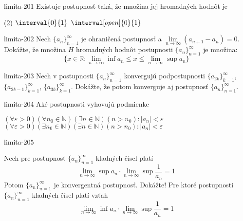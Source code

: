 \begin{defproblem}{limita-201}
Existuje postupnosť taká, že množina jej hromadných hodnôt je
\begin{tasks}(2)
\task $\interval{0}{1}$
\task $\interval[open]{0}{1}$
\end{tasks}
\end{defproblem}

\begin{defproblem}{limita-202}
Nech ${\{a_n\}}_{n=1}^\infty$ je ohraničená postupnosť a $\lim\limits_{n
\rightarrow \infty} (a_{n+1}-a_n)=0$. Dokážte, že množina $H$ hromadných hodnôt
postupnosti ${\{a_n\}}_{n=1}^\infty$ je množina:
\[
    \{x \in \mathbb{R}:
    \lim\limits_{n \rightarrow \infty} \inf a_n \leq x \leq \lim\limits_{n
    \rightarrow \infty} \sup a_n\}
\]
\end{defproblem}

\begin{defproblem}{limita-203}
Nech v postupnosti ${\{a_n\}}_{n=1}^\infty$ konvergujú podpostupnosti
${\{a_{2k}\}}_{k=1}^\infty$, ${\{a_{2k-1}\}}_{k=1}^\infty$,
${\{a_{3k}\}}_{k=1}^\infty$. Dokážte, že potom konverguje aj postupnosť
${\{a_n\}}_{n=1}^\infty$.
\end{defproblem}

\begin{defproblem}{limita-204}
Aké postupnosti vyhovujú podmienke
\begin{tasks}
\task
    $
        (\forall \varepsilon >0)
            (\forall n_0 \in \mathbb{N})
                (\exists n \in \mathbb{N})
                    (n > n_0): |a_n|< \varepsilon
    $
\task
    $
        (\forall \varepsilon > 0)
            (\exists n_0 \in \mathbb{N})
                (\exists n \in \mathbb{N})
                    (n > n_0): |a_n|< \varepsilon
    $
\end{tasks}
\end{defproblem}

\begin{defproblem}{limita-205}
\begin{tasks}
\task
    Nech pre postupnosť ${\{a_n\}}_{n=1}^\infty$ kladných čísel platí
    \[
        \lim\limits_{n \rightarrow \infty} \sup a_n
        \cdot
        \lim\limits_{n \rightarrow \infty} \sup \frac{1}{a_n} = 1
    \]
    Potom ${\{a_n\}}_{n=1}^\infty$ je konvergentná postupnosť. Dokážte!
\task
    Pre ktoré postupnosti ${\{a_n\}}_{n=1}^\infty$ kladných čísel platí vzťah
    \[
        \lim\limits_{n \rightarrow \infty} \inf a_n
        \cdot
        \lim\limits_{n \rightarrow \infty} \sup \frac{1}{a_n}=1
    \]
\end{tasks}
\end{defproblem}


